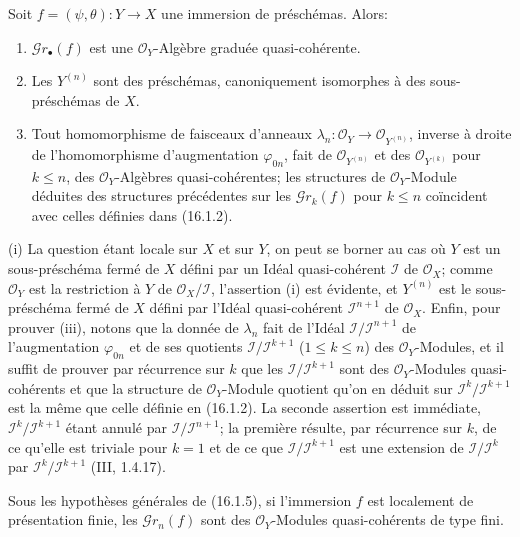 \begin{proposition}[16.1.5]
\label{IV.16.1.5}
Soit $f=(\psi,\theta):Y\to X$ une immersion de préschémas. Alors:
\begin{enumerate}
\item[(i)] $\mathscr{G}r_\bullet(f)$ est une $\mathcal{O}_Y$-Algèbre graduée
quasi-cohérente.
\item[(ii)] Les $Y^{(n)}$ sont des préschémas, canoniquement isomorphes à des
sous-préschémas de $X$.
\item[(iii)] Tout homomorphisme de faisceaux d'anneaux
$\lambda_n:\mathcal{O}_Y\to\mathcal{O}_{Y^{(n)}}$, inverse à droite de
l'homomorphisme d'augmentation $\varphi_{0n}$, fait de
$\mathcal{O}_{Y^{(n)}}$ et des $\mathcal{O}_{Y^{(k)}}$ pour $k\leq n$, des
$\mathcal{O}_Y$-Algèbres quasi-cohérentes; les structures de
$\mathcal{O}_Y$-Module déduites des structures précédentes sur les
$\mathscr{G}r_k(f)$ pour $k\leq n$ coïncident avec celles définies dans
(16.1.2).
\end{enumerate}
\end{proposition}

\noindent(i) La question étant locale sur $X$ et sur $Y$, on peut se borner au cas
où $Y$ est un sous-préschéma fermé de $X$ défini par un Idéal quasi-cohérent
$\mathscr{I}$ de $\mathcal{O}_X$; comme $\mathcal{O}_Y$ est la restriction à
$Y$ de $\mathcal{O}_X/\mathscr{I}$, l'assertion (i) est évidente, et $Y^{(n)}$
est le sous-préschéma fermé de $X$ défini par l'Idéal quasi-cohérent
$\mathscr{I}^{n+1}$ de $\mathcal{O}_X$. Enfin, pour prouver (iii), notons que la
donnée de $\lambda_n$ fait de l'Idéal
$\mathscr{I}/\mathscr{I}^{n+1}$ de l'augmentation $\varphi_{0n}$ et de ses
quotients $\mathscr{I}/\mathscr{I}^{k+1}$ ($1\leq k\leq n$) des
$\mathcal{O}_Y$-Modules, et il suffit de prouver par récurrence sur $k$ que les
$\mathscr{I}/\mathscr{I}^{k+1}$ sont des $\mathcal{O}_Y$-Modules
quasi-cohérents et que la structure de $\mathcal{O}_Y$-Module quotient qu'on en
déduit sur $\mathscr{I}^k/\mathscr{I}^{k+1}$ est la même que celle définie en
(16.1.2). La seconde assertion est immédiate,
$\mathscr{I}^k/\mathscr{I}^{k+1}$ étant annulé par
$\mathscr{I}/\mathscr{I}^{n+1}$; la première résulte, par récurrence sur $k$,
de ce qu'elle est triviale pour $k=1$ et de ce que
$\mathscr{I}/\mathscr{I}^{k+1}$ est une extension de
$\mathscr{I}/\mathscr{I}^k$ par
$\mathscr{I}^k/\mathscr{I}^{k+1}$ (III, 1.4.17).

\begin{corollary}[16.1.6]
\label{IV.16.1.6}
Sous les hypothèses générales de (16.1.5), si l'immersion $f$ est localement de
présentation finie, les $\mathscr{G}r_n(f)$ sont des $\mathcal{O}_Y$-Modules
quasi-cohérents de type fini.
\end{corollary}

